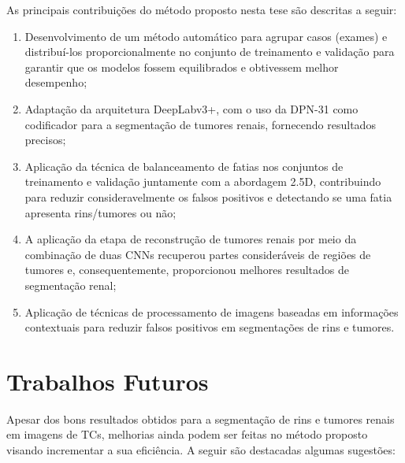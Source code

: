 As principais contribuições do método proposto nesta tese são descritas a seguir:

\begin{enumerate}
    \item Desenvolvimento de um método automático para agrupar casos (exames) e distribuí-los proporcionalmente no conjunto de treinamento e validação para garantir que os modelos fossem equilibrados e obtivessem melhor desempenho;
    
    \item Adaptação da arquitetura DeepLabv3+, com o uso da DPN-31 como codificador para a segmentação de tumores renais, fornecendo resultados precisos;
    
    \item Aplicação da técnica de balanceamento de fatias nos conjuntos de treinamento e validação juntamente com a abordagem 2.5D, contribuindo para reduzir consideravelmente os falsos positivos e detectando se uma fatia apresenta rins/tumores ou não;
    
    \item A aplicação da etapa de reconstrução de tumores renais por meio da combinação de duas CNNs recuperou partes consideráveis de regiões de tumores e, consequentemente, proporcionou melhores resultados de segmentação renal;
    
    \item Aplicação de técnicas de processamento de imagens baseadas em informações contextuais para reduzir falsos positivos em segmentações de rins e tumores.
\end{enumerate}

\section{Trabalhos Futuros}
\label{sec:trabalhos-futuros}

Apesar dos bons resultados obtidos para a segmentação de rins e tumores renais em imagens de TCs, melhorias ainda podem ser feitas no método proposto visando incrementar a sua eficiência. A seguir são destacadas algumas sugestões:

